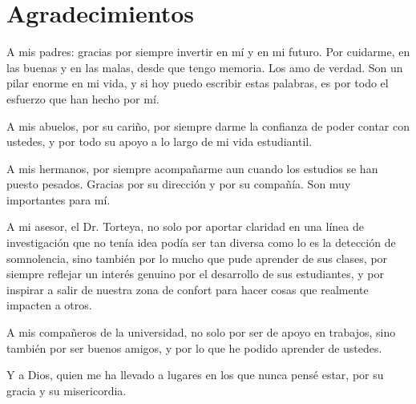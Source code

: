 %
\section*{Agradecimientos}
\label{sec::agradecimientos}


\begin{onehalfspacing} %
\justifying %

A mis padres: gracias por siempre invertir en mí y en mi futuro. Por cuidarme, en las buenas y en las malas, desde que tengo memoria. Los amo de verdad. Son un pilar enorme en mi vida, y si hoy puedo escribir estas palabras, es por todo el esfuerzo que han hecho por mí.

A mis abuelos, por su cariño, por siempre darme la confianza de poder contar con ustedes, y por todo su apoyo a lo largo de mi vida estudiantil. 

A mis hermanos, por siempre acompañarme aun cuando los estudios se han puesto pesados. Gracias por su dirección y por su compañía. Son muy importantes para mí.

A mi asesor, el Dr. Torteya, no solo por aportar claridad en una línea de investigación que no tenía idea podía ser tan diversa como lo es la detección de somnolencia, sino también por lo mucho que pude aprender de sus clases, por siempre reflejar un interés genuino por el desarrollo de sus estudiantes, y por inspirar a salir de nuestra zona de confort para hacer cosas que realmente impacten a otros. 

A mis compañeros de la universidad, no solo por ser de apoyo en trabajos, sino también por ser buenos amigos, y por lo que he podido aprender de ustedes. 

Y a Dios, quien me ha llevado a lugares en los que nunca pensé estar, por su gracia y su misericordia.

\end{onehalfspacing}

\vspace{1.5cm} %
\begin{flushright}
\textbf{\thesisAuthorA} \\ %
\end{flushright}


